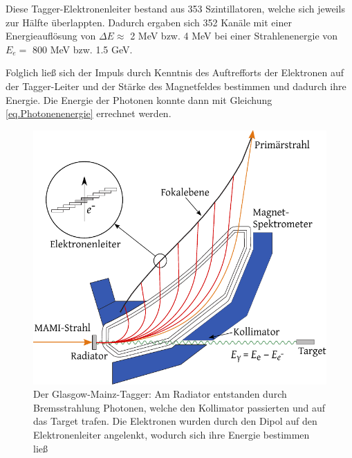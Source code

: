 \documentclass[a4paper,11pt,oneside,final,german,openbib,pdftex]{scrbook}
\begin{document}
{ Diese Tagger-Elektronenleiter bestand aus 353 Szintillatoren, welche sich jeweils zur H\"alfte \"uberlappten.
 Dadurch ergaben sich 352 Kan\"ale mit einer Energieaufl\"osung von $\Delta E \approx$  2 MeV bzw. 4 MeV bei einer Strahlenenergie von $E_e=$ 800 MeV bzw. 1.5 GeV. 
 
 Folglich lie{\ss} sich der Impuls durch Kenntnis des Auftrefforts der Elektronen auf der Tagger-Leiter und der St\"arke des Magnetfeldes bestimmen und dadurch ihre Energie. Die Energie der Photonen konnte dann mit Gleichung \ref{eq.Photonenenergie} errechnet werden.
\newline 
\begin{figure}[h!]
	\begin{center}
	\includegraphics{TAGGER}
	
	\caption{Der Glasgow-Mainz-Tagger: Am Radiator entstanden durch Bremsstrahlung Photonen, welche den Kollimator passierten und auf das Target trafen. Die Elektronen wurden durch den Dipol auf den Elektronenleiter angelenkt, wodurch sich ihre Energie bestimmen lie{\ss}\cite{Un08}}
\label{fig.TAGGER}	
\end{center}
\end{figure}
 
 
}
\end{document}
